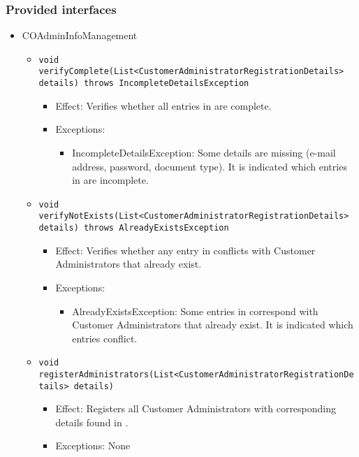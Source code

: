 \subsubsection*{Provided interfaces}
\begin{itemize}
	\item COAdminInfoManagement
    \begin{itemize}
		\item \texttt{void verifyComplete(List<CustomerAdministratorRegistrationDetails> details) throws IncompleteDetailsException}
        \begin{itemize}
            \item Effect: Verifies whether all entries in  are complete.
            \item Exceptions:
            \begin{itemize}
                \item IncompleteDetailsException: Some details are missing (e-mail address, password, document type). It is indicated which entries in  are incomplete.
            \end{itemize}
        \end{itemize}

        \item \texttt{void verifyNotExists(List<CustomerAdministratorRegistrationDetails> details) throws AlreadyExistsException}
        \begin{itemize}
            \item Effect: Verifies whether any entry in  conflicts with Customer Administrators that already exist.
            \item Exceptions:
            \begin{itemize}
                \item AlreadyExistsException: Some entries in  correspond with Customer Administrators that already exist. It is indicated which entries conflict.
            \end{itemize}
        \end{itemize}

        \item \texttt{void registerAdministrators(List<CustomerAdministratorRegistrationDetails> details)}
        \begin{itemize}
            \item Effect: Registers all Customer Administrators with corresponding details found in .
            \item Exceptions: None
        \end{itemize}


\end{itemize}
\end{itemize}
